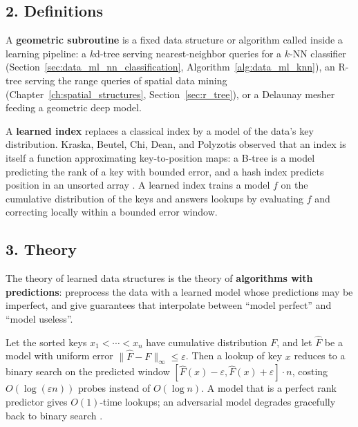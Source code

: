 \subsection{2. Definitions}

\begin{definition}\label{def:data_ml_subroutine}
  A \textbf{geometric subroutine} is a fixed data structure or algorithm
  called inside a learning pipeline: a $k$d-tree serving nearest-neighbor
  queries for a $k$-NN classifier (Section~\ref{sec:data_ml_nn_classification},
  Algorithm~\ref{alg:data_ml_knn}), an R-tree serving the range queries of
  spatial data mining (Chapter~\ref{ch:spatial_structures},
  Section~\ref{sec:r_tree}), or a Delaunay mesher feeding a geometric deep
  model.
\end{definition}

\begin{definition}\label{def:data_ml_learned_index}
  A \textbf{learned index} replaces a classical index
  by a model of the data's key distribution. Kraska, Beutel, Chi, Dean, and
  Polyzotis observed that an index is itself a function approximating
  key-to-position maps: a B-tree is a model predicting the rank of a key
  with bounded error, and a hash index predicts position in an unsorted
  array \cite{kraska2018}. A learned index trains a model $f$ on the
  cumulative distribution of the keys and answers lookups by evaluating $f$
  and correcting locally within a bounded error window.
\end{definition}

\subsection{3. Theory}

The theory of learned data structures is the theory of \textbf{algorithms
with predictions}: preprocess the data
with a learned model whose predictions may be imperfect, and give
guarantees that interpolate between ``model perfect'' and ``model useless''.

\begin{theorem}\label{thm:data_ml_learned_lookup}
  Let the sorted keys $x_1 < \cdots < x_n$ have cumulative distribution $F$,
  and let $\hat{F}$ be a model with uniform error
  $\|\hat{F} - F\|_\infty \leq \varepsilon$. Then a lookup of key $x$
  reduces to a binary search on the predicted window
  $[\hat{F}(x) - \varepsilon, \hat{F}(x) + \varepsilon] \cdot n$, costing
  $O(\log(\varepsilon n))$ probes instead of $O(\log n)$. A model that is a
  perfect rank predictor gives $O(1)$-time lookups; an adversarial model
  degrades gracefully back to binary search \cite{kraska2018}.
\end{theorem}

